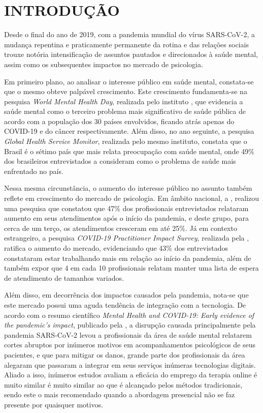 \chapter{INTRODUÇÃO}
\label{chap:introducao}

Desde o final do ano de 2019, com a pandemia mundial do vírus SARS-CoV-2, a mudança repentina e praticamente permanente da rotina e das relações sociais trouxe notória intensificação de assuntos pautados e direcionados à saúde mental, assim como os subsequentes impactos no mercado de psicologia.

Em primeiro plano, ao analisar o interesse público em saúde mental, constata-se que o mesmo obteve palpável crescimento. Este crescimento fundamenta-se na pesquisa \textit{World Mental Health Day}, realizada pelo instituto , que evidencia a saúde mental como o terceiro problema mais significativo de saúde pública de acordo com a população dos 30 países envolvidos, ficando atrás apenas do COVID-19 e do câncer respectivamente. Além disso, no ano seguinte, a pesquisa \textit{Global Health Service Monitor}, realizada pelo mesmo instituto, constata que o Brasil é o sétimo país que mais relata preocupação com saúde mental, onde 49\% dos brasileiros entrevistados a consideram como o problema de saúde mais enfrentado no país.

Nessa mesma circunstância, o aumento do interesse público no assunto também reflete em crescimento do mercado de psicologia. Em âmbito nacional, a , realizou uma pesquisa que constatou que 47\% dos profissionais entrevistados relataram aumento em seus atendimentos após o início da pandemia, e deste grupo, para cerca de um terço, os atendimentos cresceram em até 25\%. Já em contexto estrangeiro, a pesquisa \textit{COVID-19 Practitioner Impact Survey}, realizada pela , ratifica o aumento do mercado, evidenciando que 43\% dos entrevistados constataram estar trabalhando mais em relação ao início da pandemia, além de também expor que 4 em cada 10 profissionais relatam manter uma lista de espera de atendimento de tamanhos variados.

Além disso, em decorrência dos impactos causados pela pandemia, nota-se que este mercado possui uma aguda tendência de integração com a tecnologia. De acordo com o resumo científico \textit{Mental Health and COVID-19: Early evidence of the pandemic’s impact}, publicado pela , a disrupção causada principalmente pela pandemia SARS-CoV-2 levou a profissionais da área de saúde mental relatarem cortes abruptos por inúmeros motivos em acompanhamentos psicológicos de seus pacientes, e que para mitigar os danos, grande parte dos profissionais da área alegaram que passaram a integrar em seus serviços inúmeras tecnologias digitais. Aliado a isso, inúmeros estudos avaliam a eficácia do emprego da terapia online é muito similar  é muito similar ao que é alcançado pelos métodos tradicionais, sendo este o mais recomendado quando a abordagem presencial não se faz presente por quaisquer motivos.

